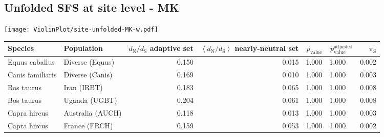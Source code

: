 \subsection{Unfolded SFS at site level - MK} 
\begin{center}
\texttt{[image: ViolinPlot/site-unfolded-MK-w.pdf]} 
\begin{adjustbox}{width = 1\textwidth}
\begin{tabular}{|l|l|r|r|r|r|r|}
\toprule
             Species &                      Population & \specialcell{$d_{\mathrm{N}} / d_{\mathrm{S}}$ \\ adaptive set} & \specialcell{$\left< d_{\mathrm{N}} / d_{\mathrm{S}} \right>$ \\ nearly-neutral set} & $p_{\mathrm{value}}$ & $p_{\mathrm{value}}^{\mathrm{adjusted}}$ & $\pi_{\textrm{S}}$ \\
\midrule
      Equus caballus &                 Diverse (Equus) &                                              0.150 &                                              0.015 &                1.000 &                                  1.000~~ &              0.002 \\
    Canis familiaris &                 Diverse (Canis) &                                              0.169 &                                              0.010 &                1.000 &                                  1.000~~ &              0.003 \\
          Bos taurus &                     Iran (IRBT) &                                              0.183 &                                              0.065 &                1.000 &                                  1.000~~ &              0.008 \\
          Bos taurus &                   Uganda (UGBT) &                                              0.204 &                                              0.061 &                1.000 &                                  1.000~~ &              0.008 \\
        Capra hircus &                Australia (AUCH) &                                              0.118 &                                              0.013 &                1.000 &                                  1.000~~ &              0.003 \\
        Capra hircus &                   France (FRCH) &                                              0.159 &                                              0.053 &                1.000 &                                  1.000~~ &              0.002 \\

\end{tabular}
\end{adjustbox}
\end{center}
